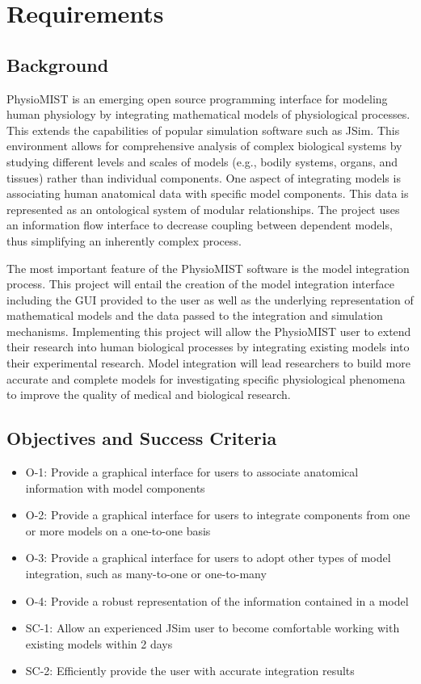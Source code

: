 \section{Requirements}
\subsection{Background}
PhysioMIST is an emerging open source programming interface for modeling human physiology by integrating mathematical models of physiological processes.
This extends the capabilities of popular simulation software such as JSim.
This environment allows for comprehensive analysis of complex biological systems by studying different levels and scales of models (e.g., bodily systems, organs, and tissues) rather than individual components.
One aspect of integrating models is associating human anatomical data with specific model components. This data is represented as an ontological system of modular relationships.
The project uses an information flow interface to decrease coupling between dependent models, thus simplifying an inherently complex process.

The most important feature of the PhysioMIST software is the model integration process.
This project will entail the creation of the model integration interface including the GUI provided to the user as well as the underlying representation of mathematical models and the data passed to the integration and simulation mechanisms.
Implementing this project will allow the PhysioMIST user to extend their research into human biological processes by integrating existing models into their experimental research.
Model integration will lead researchers to build more accurate and complete models for investigating specific physiological phenomena to improve the quality of medical and biological research.

\subsection{Objectives and Success Criteria}
\begin{itemize}
\item O-1: Provide a graphical interface for users to associate anatomical information with model components
\item O-2: Provide a graphical interface for users to integrate components from one or more models on a one-to-one basis
\item O-3: Provide a graphical interface for users to adopt other types of model integration, such as many-to-one or one-to-many
\item O-4: Provide a robust representation of the information contained in a model
\item SC-1: Allow an experienced JSim user to become comfortable working with existing models within 2 days
\item SC-2: Efficiently provide the user with accurate integration results
\end{itemize}

